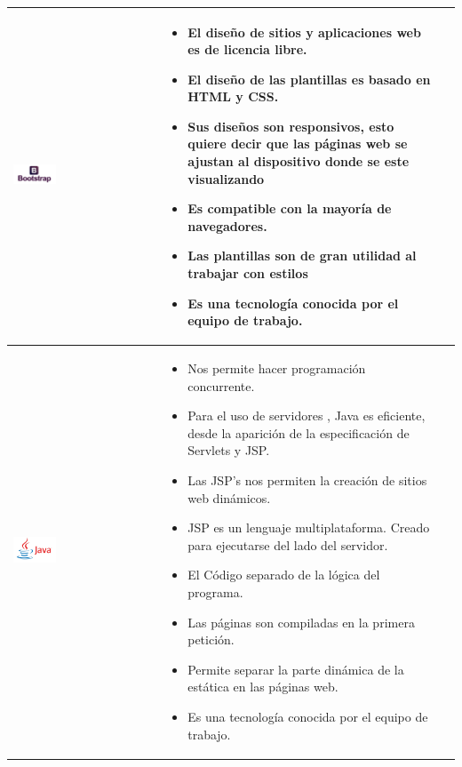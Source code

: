 \newpage
\begin{table}[b!]
\centering
\begin{tabular}{|p{2cm}|ll}
        \hline
       \multicolumn{1}{|p{5cm}|}{\includegraphics[width=0.3\textwidth]{images/bootstrap}}& 
          \multicolumn{1}{p{10cm}|}{
          \begin{itemize}
          \vspace{-15mm}
          \item El diseño de sitios y aplicaciones web es de licencia libre.
          \item El diseño de las  plantillas es basado en HTML y CSS.
          \item Sus diseños son responsivos, esto quiere decir que las páginas web se ajustan al dispositivo donde se este visualizando  
          \item Es compatible con la mayoría de navegadores.
          \item Las plantillas son de gran utilidad al trabajar con estilos
          \item Es una tecnología conocida por el equipo de trabajo.
      \end{itemize}} \\
\hline
 \multicolumn{1}{|p{5cm}|}{\includegraphics[width=0.3\textwidth]{images/java}}& 
          \multicolumn{1}{p{10cm}|}{
          \begin{itemize}
          \vspace{-20mm}
          \item Nos permite hacer programación concurrente.
        \item Para el uso de servidores , Java es eficiente, desde la aparición de la especificación de Servlets y JSP.
        \item Las JSP's nos permiten la  creación de sitios web dinámicos.
        \item JSP es un lenguaje multiplataforma. Creado para ejecutarse del lado del servidor.
        \item El Código separado de la lógica del programa.
        \item Las páginas son compiladas en la primera petición.
        \item Permite separar la parte dinámica de la estática en las páginas web.
        \item Es una tecnología conocida por el equipo de trabajo.
      \end{itemize}} \\
      \hline
      \end{tabular}
    \end{table}

